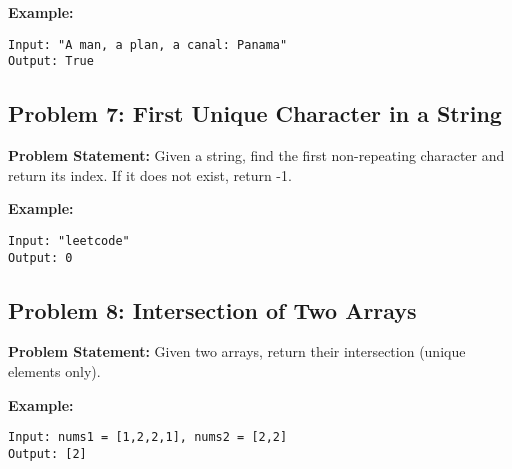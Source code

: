 \documentclass[12pt]{article}
\begin{document}
\textbf{Example:}
\begin{verbatim}
Input: "A man, a plan, a canal: Panama"
Output: True
\end{verbatim}


\vspace{1cm}

\subsection*{Problem 7: First Unique Character in a String}
\textbf{Problem Statement:} Given a string, find the first non-repeating character and return its index. If it does not exist, return -1.

\textbf{Example:}
\begin{verbatim}
Input: "leetcode"
Output: 0
\end{verbatim}


\vspace{1cm}

\subsection*{Problem 8: Intersection of Two Arrays}
\textbf{Problem Statement:} Given two arrays, return their intersection (unique elements only).

\textbf{Example:}
\begin{verbatim}
Input: nums1 = [1,2,2,1], nums2 = [2,2]
Output: [2]
\end{verbatim}


\vspace{1cm}
\end{document}

